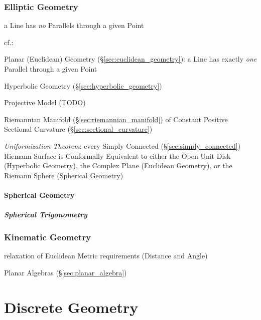\subsubsection{Elliptic Geometry}\label{sec:elliptic_geometry}

a Line has \emph{no} Parallels through a given Point

cf.:

\fist Planar (Euclidean) Geometry (\S\ref{sec:euclidean_geometry}): a Line has
exactly \emph{one} Parallel through a given Point

\fist Hyperbolic Geometry (\S\ref{sec:hyperbolic_geometry})

Projective Model (TODO)

Riemannian Manifold (\S\ref{sec:riemannian_manifold}) of Constant Positive
Sectional Curvature (\S\ref{sec:sectional_curvature})

\emph{Uniformization Theorem}: every Simply Connected
(\S\ref{sec:simply_connected}) Riemann Surface is Conformally Equivalent to
either the Open Unit Disk (Hyperbolic Geometry), the Complex Plane (Euclidean
Geometry), or the Riemann Sphere (Spherical Geometry)



\paragraph{Spherical Geometry}\label{sec:spherical_geometry}\hfill

\subparagraph{Spherical Trigonometry}\label{sec:spherical_trigonometry}\hfill



\subsubsection{Kinematic Geometry}\label{sec:kinematic_geometry}\hfill

relaxation of Euclidean Metric requirements (Distance and Angle)

Planar Algebras (\S\ref{sec:planar_algebra})




\section{Discrete Geometry}\label{sec:discrete_geometry}

